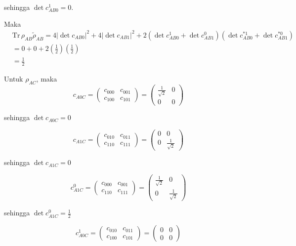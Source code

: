 \begin{enumerate}
	sehingga $\det c_{AB0}^1 = 0$.
	
	Maka
	\begin{equation}
		\begin{aligned}
			&\mathrm{Tr}\,\rho_{AB}\tilde{\rho}_{AB}=4 |\det c_{AB0}|^2+ 4 |\det c_{AB1}|^2+ 2 (\det c_{AB0}^1 + \det c_{AB1}^0)(\det c^{*1}_{AB0} + \det c^{*0}_{AB1})\\
			&=0+0+2(\frac{1}{2})(\frac{1}{2})\\
			&=\frac{1}{2}
		\end{aligned}
	\end{equation}
	
	Untuk $\rho_{AC}$, maka
	\begin{equation}
		c_{A0C}=
		\begin{pmatrix}
			c_{000} & c_{001} \\
			c_{100} & c_{101}
		\end{pmatrix}=
		\begin{pmatrix}
			\frac{1}{\sqrt{2}} & 0 \\
			0 & 0
		\end{pmatrix}
	\end{equation}
	
	sehingga $\det c_{A0C} = 0$
	
	\begin{equation}
		c_{A1C}=
		\begin{pmatrix}
			c_{010} & c_{011} \\
			c_{110} & c_{111}
		\end{pmatrix}=
		\begin{pmatrix}
			0 & 0 \\
			0 & \frac{1}{\sqrt{2}}
		\end{pmatrix}
	\end{equation}
	
	sehingga $\det c_{A1C} = 0$
	
	\begin{equation}
		c_{A1C}^0=
		\begin{pmatrix}
			c_{000} & c_{001} \\
			c_{110} & c_{111}
		\end{pmatrix}=
		\begin{pmatrix}
			\frac{1}{\sqrt{2}} & 0 \\
			0 & \frac{1}{\sqrt{2}}
		\end{pmatrix}
	\end{equation}
	
	sehingga $\det c_{A1C}^0 = \frac{1}{2}$
	
	\begin{equation}
		c_{A0C}^1=
		\begin{pmatrix}
			c_{010} & c_{011} \\
			c_{100} & c_{101}
		\end{pmatrix}=
		\begin{pmatrix}
			0 & 0 \\
			0 & 0
		\end{pmatrix}
	\end{equation}
	

\end{enumerate}
